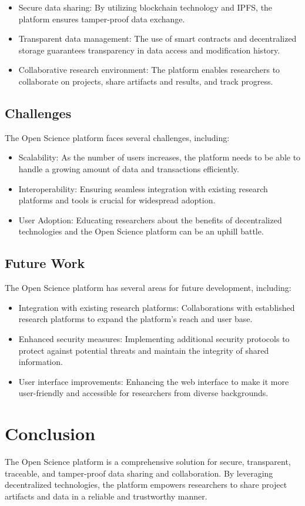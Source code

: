 \documentclass{article}
\begin{document}
\begin{itemize}
      \item Secure data sharing: By utilizing blockchain technology and IPFS, the platform ensures tamper-proof data exchange.
      \item Transparent data management: The use of smart contracts and decentralized storage guarantees transparency in data access and modification history.
      \item Collaborative research environment: The platform enables researchers to collaborate on projects, share artifacts and results, and track progress.
\end{itemize}

\subsection{Challenges}

The Open Science platform faces several challenges, including:

\begin{itemize}
      \item Scalability: As the number of users increases, the platform needs to be able to handle a growing amount of data and transactions efficiently.
      \item Interoperability: Ensuring seamless integration with existing research platforms and tools is crucial for widespread adoption.
      \item User Adoption: Educating researchers about the benefits of decentralized technologies and the Open Science platform can be an uphill battle.
\end{itemize}

\subsection{Future Work}

The Open Science platform has several areas for future development, including:

\begin{itemize}
      \item Integration with existing research platforms: Collaborations with established research platforms to expand the platform's reach and user base.
      \item Enhanced security measures: Implementing additional security protocols to protect against potential threats and maintain the integrity of shared information.
      \item User interface improvements: Enhancing the web interface to make it more user-friendly and accessible for researchers from diverse backgrounds.
\end{itemize}

\section{Conclusion}
The Open Science platform is a comprehensive solution for secure, transparent, traceable, and tamper-proof data sharing and collaboration. By leveraging decentralized technologies, the platform empowers researchers to share project artifacts and data in a reliable and trustworthy manner.
\end{document}
